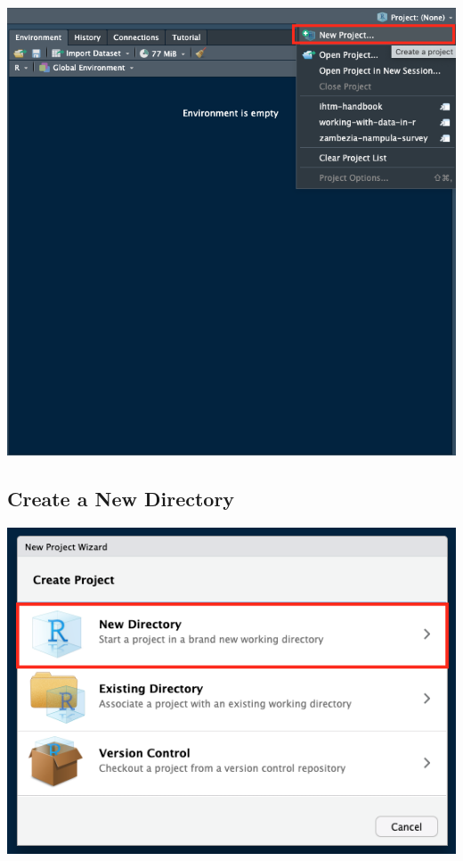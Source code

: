 \documentclass[
  12pt,
]{book}
\begin{document}
\includegraphics{images/new_project2.png}

\hypertarget{create-a-new-directory}{%
\subsection{\texorpdfstring{Create a \textbf{New Directory}}{Create a New Directory}}\label{create-a-new-directory}}

\includegraphics{images/new_project3.png}
\end{document}
